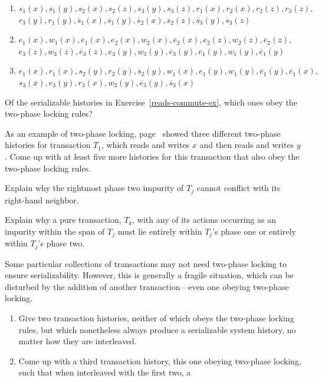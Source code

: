 \begin{chapterEnumerate}
\begin{enumerate}
\item
$s_1(x),s_1(y),s_2(x),s_2(z),s_3(y),s_3(z),r_1(x), r_2(x), r_2(z), r_3(z),$\\$r_3(y), r_1(y),\overline{s}_1(x),\overline{s}_1(y),\overline{s}_2(x),\overline{s}_2(z),\overline{s}_3(y),\overline{s}_3(z)$
\item
$e_1(x), w_1(x), \overline{e}_1(x), e_2(x), w_2(x), \overline{e}_2(x), e_2(z), w_2(z),
  \overline{e}_2(z),$\\$e_3(z), w_3(z), \overline{e}_3(z), e_3(y), w_3(y), \overline{e}_3(y), e_1(y),
  w_1(y), \overline{e}_1(y)$
\item
$e_1(x), r_1(x), s_2(y), r_2(y), \overline{s}_2(y), w_1(x), e_1(y), w_1(y),
  \overline{e}_1(y), \overline{e}_1(x),$\\$s_3(x), e_3(y),
  r_3(x), w_3(y), \overline{e}_3(y), \overline{s}_3(x)$
\end{enumerate}
\item
Of the serializable histories in
Exercise~\ref{reads-commute-ex}, which ones obey the two-phase locking rules?
\item\label{two-phase-orders-ex}
As an example of two-phase locking, page~\pageref{two-phase-examples} showed three different
two-phase histories for transaction $T_1$, which reads and writes $x$
and then reads and writes $y$.  Come up with at least five more
histories for this transaction that also obey the two-phase locking
rules.
\item\label{phase-two-purification-ex}
Explain why the rightmost phase two impurity of $T_j$ cannot conflict
with its right-hand neighbor.
\item
Explain why a pure transaction, $T_k$, with any of its actions
occurring as an impurity within the span of $T_j$ must lie entirely
within $T_j$'s phase one or entirely within $T_j$'s phase two.
\item
Some particular collections of transactions may not need two-phase
locking to ensure serializability.  However, this is generally a
fragile situation, which can be disturbed by the addition of another
transaction---even one obeying two-phase locking.
\begin{enumerate}
\item
Give two transaction histories, neither of which obeys the two-phase
locking rules, but which nonetheless always produce a serializable
system history, no matter how they are interleaved.
\item
Come up with a third transaction history, this one obeying two-phase
locking, such that when interleaved with the first two, a

\end{enumerate}
\end{chapterEnumerate}
